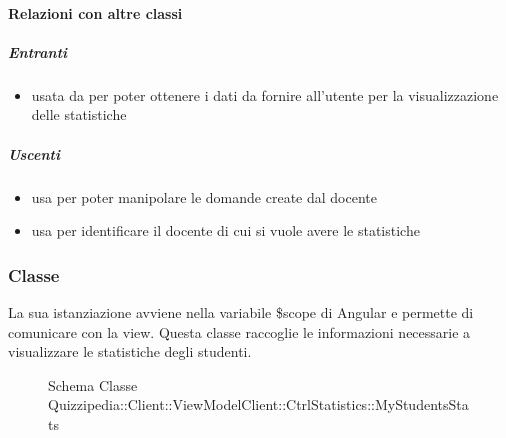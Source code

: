 \paragraph{Relazioni con altre classi}
\subparagraph{Entranti}
\begin{itemize}
\item usata da  per poter ottenere i dati da fornire all'utente per la visualizzazione delle statistiche
\end{itemize}
\subparagraph{Uscenti}
\begin{itemize}
\item usa  per poter manipolare le domande create dal docente
\item usa  per identificare il docente di cui si vuole avere le statistiche
\end{itemize}
\subsubsection{Classe }
La sua istanziazione avviene nella variabile \$scope di Angular e permette di comunicare con la view. Questa classe raccoglie le informazioni necessarie a visualizzare le statistiche degli studenti.
\begin{figure}[H]
\centering
\noindent{}
\caption[Schema Classe MyStudentsStats]{Schema Classe Quizzipedia::Client::ViewModelClient::CtrlStatistics::MyStudentsStats}
\end{figure}
